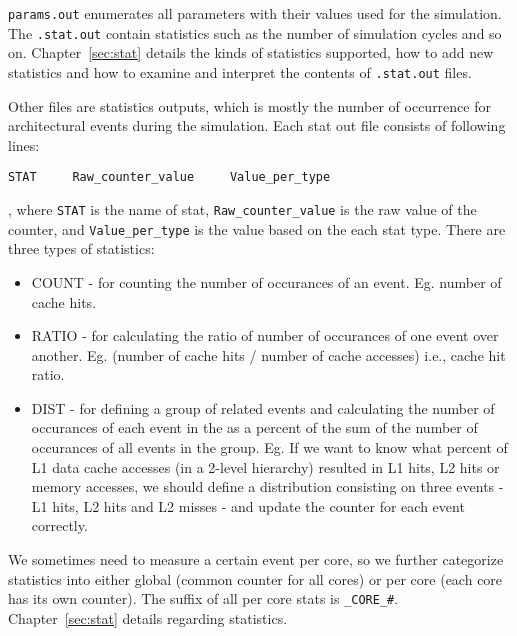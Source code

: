 \noindent \Verb+params.out+ enumerates all parameters with their values used
for the simulation. The \Verb+.stat.out+ contain statistics such as the number
of simulation cycles and so on. Chapter~\ref{sec:stat} details the kinds of
statistics supported, how to add new statistics and how to examine and
interpret the contents of \Verb+.stat.out+ files.


\ignore
{
 Other files are statistics outputs, which is mostly the number
of occurrence for architectural events during the simulation. Each
stat out file consists of following lines:

\begin{Verbatim}
STAT     Raw_counter_value     Value_per_type
\end{Verbatim}

\noindent
, where \Verb+STAT+ is the name of stat, \Verb+Raw_counter_value+ is
the raw value of the counter, and \Verb+Value_per_type+ is the value
based on the each stat type. There are three types of statistics:

\begin{itemize}

  \item COUNT - for counting the number of occurances of an event. Eg. number
  of cache hits. 

  \item RATIO - for calculating the ratio of number of occurances of one event
  over another. Eg. (number of cache hits / number of cache accesses) i.e.,
  cache hit ratio.

  \item DIST - for defining a group of related events and calculating the
  number of occurances of each event in the as a percent of the sum of the
  number of occurances of all events in the group.  Eg. If we want to know what
  percent of L1 data cache accesses (in a 2-level hierarchy) resulted in L1
  hits, L2 hits or memory accesses, we should define a distribution consisting
  on three events - L1 hits, L2 hits and L2 misses  - and update the
  counter for each event correctly. 
\end{itemize}


\noindent
We sometimes need to measure a certain event per core, so we further
categorize statistics into either global (common counter for all
cores) or per core (each core has its own counter). The suffix of all
per core stats is \Verb+_CORE_#+. Chapter~\ref{sec:stat} details
regarding statistics.


}

